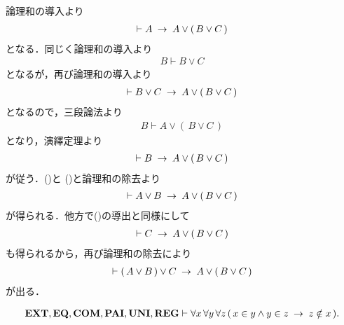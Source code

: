 	\begin{sketch}
		論理和の導入より
		\begin{align}
			\vdash A \hspace{0.25em}\rightarrow\hspace{0.25em} A \vee (\, B \vee C\, )
			\label{fom:associative_law_of_conjunctions_1}
		\end{align}
		となる．同じく論理和の導入より
		\begin{align}
			B \vdash B \vee C
		\end{align}
		となるが，再び論理和の導入より
		\begin{align}
			\vdash B \vee C \hspace{0.25em}\rightarrow\hspace{0.25em} A \vee (\, B \vee C\, )
		\end{align}
		となるので，三段論法より
		\begin{align}
			B \vdash A \vee (\, B \vee C\, )
		\end{align}
		となり，演繹定理より
		\begin{align}
			\vdash B \hspace{0.25em}\rightarrow\hspace{0.25em} A \vee (\, B \vee C\, )
			\label{fom:associative_law_of_conjunctions_2}
		\end{align}
		が従う．()と
		()と論理和の除去より
		\begin{align}
			\vdash A \vee B \hspace{0.25em}\rightarrow\hspace{0.25em} A \vee (\, B \vee C\, )
		\end{align}
		が得られる．他方で()の導出と同様にして
		\begin{align}
			\vdash C \hspace{0.25em}\rightarrow\hspace{0.25em} A \vee (\, B \vee C\, )
		\end{align}
		も得られるから，再び論理和の除去により
		\begin{align}
			\vdash (\, A \vee B\, ) \vee C \hspace{0.25em}\rightarrow\hspace{0.25em} A \vee (\, B \vee C\, )
		\end{align}
		が出る．
		\QED
	\end{sketch}
	
	\begin{screen}
		\begin{thm}[集合のどの三組も所属関係で堂々巡りしない]
		\label{thm:no_three_sets_go_round}
			\begin{align}
				\mbox{{\bf EXT}},\mbox{{\bf EQ}},\mbox{\bf COM},\mbox{{\bf PAI}},\mbox{{\bf UNI}},\mbox{{\bf REG}} \vdash 
				\forall x\, \forall y\, \forall z\, 
				(\, x \in y \wedge y \in z \hspace{0.25em}\rightarrow\hspace{0.25em} z \notin x\, ).
			\end{align}
		\end{thm}
	\end{screen}
	
